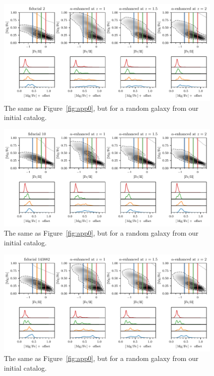 \begin{appendices}
\begin{figure}
  \centering
  \includegraphics[width=\textwidth]{ch4/app_2.pdf}
  \caption{The same as Figure~\ref{fig:app0}, but for a random galaxy from our initial catalog.}
  \label{fig:app1}
\end{figure}

\begin{figure}
  \centering
  \includegraphics[width=\textwidth]{ch4/app_10.pdf}
  \caption{The same as Figure~\ref{fig:app0}, but for a random galaxy from our initial catalog.}
  \label{fig:app2}
\end{figure}

\begin{figure}
  \centering
  \includegraphics[width=\textwidth]{ch4/app_143882.pdf}
  \caption{The same as Figure~\ref{fig:app0}, but for a random galaxy from our initial catalog.}
  \label{fig:app3}
\end{figure}


\end{appendices}
